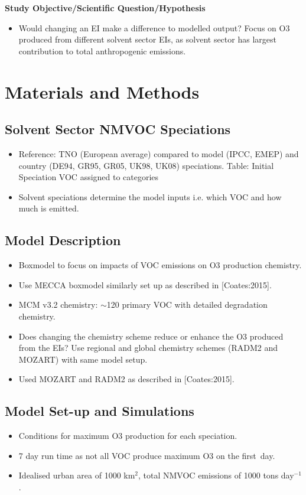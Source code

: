 \documentclass[14pt]{extarticle}
\begin{document}
\textbf{Study Objective/Scientific Question/Hypothesis}
\begin{itemize}
	\item Would changing an EI make a difference to modelled output? Focus on O3 produced from different solvent sector EIs, as solvent sector has largest contribution to total anthropogenic emissions.
\end{itemize}

\section{Materials and Methods}

\subsection{Solvent Sector NMVOC Speciations}
\begin{itemize}
    \item Reference: TNO (European average) compared to model (IPCC, EMEP) and country (DE94, GR95, GR05, UK98, UK08) speciations. Table: Initial Speciation VOC assigned to categories
	\item Solvent speciations determine the model inputs i.e. which VOC and how much is emitted.
\end{itemize}

\subsection{Model Description}
\begin{itemize}
    \item Boxmodel to focus on impacts of VOC emissions on O3 production chemistry.
    \item Use MECCA boxmodel similarly set up as described in [Coates:2015].
	\item MCM v3.2 chemistry: $\sim$120 primary VOC with detailed degradation chemistry.
	\item Does changing the chemistry scheme reduce or enhance the O3 produced from the EIs? Use regional and global chemistry schemes (RADM2 and MOZART) with same model setup.
    \item Used MOZART and RADM2 as described in [Coates:2015].
\end{itemize}

\subsection{Model Set-up and Simulations}
\begin{itemize}
    \item Conditions for maximum O3 production for each speciation.
    \item 7 day run time as not all VOC produce maximum O3 on the first~day.
    \item Idealised urban area of 1000 km$^2$, total NMVOC emissions of 1000 tons day$^{-1}$.
\end{itemize}
\end{document}
